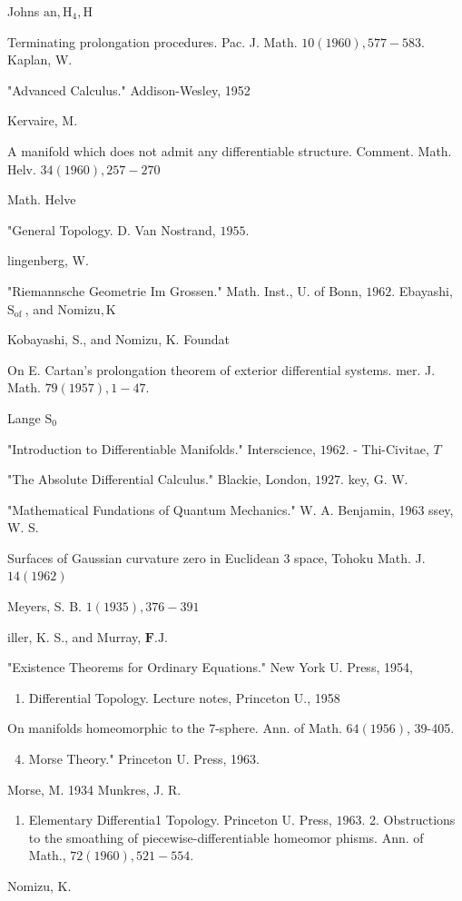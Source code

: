 \documentclass[10pt]{article}
\begin{document}
Johns $\mathrm{an}, \mathrm{H}_{4}, \mathrm{H}$

Terminating prolongation procedures. Pac. J. Math. $10(1960), 577-583 .$ Kaplan, W.

"Advanced Calculus." Addison-Wesley, 1952

Kervaire, M.

A manifold which does not admit any differentiable structure. Comment. Math. Helv. $34(1960), 257-270$

Math. Helve

"General Topology. D. Van Nostrand, $1955 .$

lingenberg, W.

"Riemannsche Geometrie Im Grossen." Math. Inst., U. of Bonn, $1962 .$ Ebayashi, $\mathrm{S}_{\text {of }}$, and $\mathrm{Nomizu}, \mathrm{K}$

Kobayashi, S., and Nomizu, K. Foundat

On E. Cartan's prolongation theorem of exterior differential systems. mer. J. Math. $79(1957), 1-47 .$

Lange $\mathrm{S}_{0}$

"Introduction to Differentiable Manifolds." Interscience, $1962 .$ - Thi-Civitae, $T$

"The Absolute Differential Calculus." Blackie, London, $1927 .$ key, G. W.

"Mathematical Fundations of Quantum Mechanics." W. A. Benjamin, 1963 ssey, W. S.

Surfaces of Gaussian curvature zero in Euclidean 3 space, Tohoku Math. J. $14(1962)$

Meyers, S. B. $1(1935), 376-391$

iller, K. S., and Murray, $\mathbf{F} . \mathrm{J}$.

"Existence Theorems for Ordinary Equations." New York U. Press, 1954,

\begin{enumerate}
  \item Differential Topology. Lecture notes, Princeton U., 1958
\end{enumerate}
On manifolds homeomorphic to the 7-sphere. Ann. of Math. $64(1956)$, 39-405.

\begin{enumerate}
  \setcounter{enumi}{3}
  \item Morse Theory." Princeton U. Press, 1963.
\end{enumerate}
Morse, M. 1934 Munkres, J. R.

\begin{enumerate}
  \item Elementary Differentia1 Topology. Princeton U. Press, $1963 .$ 2. Obstructions to the smoathing of piecewise-differentiable homeomor phisms. Ann. of Math., $72(1960), 521-554 .$
\end{enumerate}
Nomizu, K.
\end{document}
